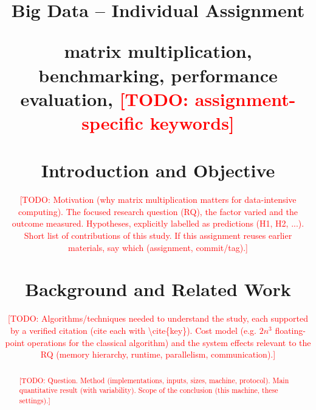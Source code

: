 \documentclass[conference,a4paper]{IEEEtran}
\newcommand{\todo}[1]{\textcolor{red}{[TODO: #1]}}
\begin{document}
\title{%
\large Big Data -- Individual Assignment %

\author{
}

\maketitle

\begin{abstract}
\todo{Question. Method (implementations, inputs, sizes, machine, protocol). Main quantitative result
(with variability). Scope of the conclusion (this machine, these settings).}
\end{abstract}

\begin{IEEEkeywords}
matrix multiplication, benchmarking, performance evaluation, \todo{assignment-specific keywords}
\end{IEEEkeywords}

\section{Introduction and Objective}
\label{sec:intro}
\todo{Motivation (why matrix multiplication matters for data-intensive computing).
The focused research question (RQ), the factor varied and the outcome measured.
Hypotheses, explicitly labelled as predictions (H1, H2, ...). Short list of contributions of this study.
If this assignment reuses earlier materials, say which (assignment, commit/tag).}

\section{Background and Related Work}
\label{sec:background}
\todo{Algorithms/techniques needed to understand the study, each supported by a verified citation
(cite each with \textbackslash cite\{key\}). Cost model (e.g. $2n^3$ floating-point operations for the classical algorithm) and the
system effects relevant to the RQ (memory hierarchy, runtime, parallelism, communication).}

}
\end{document}
